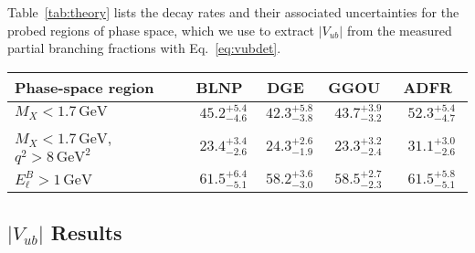 \documentclass[twocolumn,aps,prd,superscriptaddress,nofootinbib,floatfix,preprintnumbers,a4]{revtex4-1}
\newcommand{\Vub}{V_{ub}}
\newcommand{\bulnu}{\ensuremath{B \to X_u \, \ell^+\, \nu_{\ell}}\xspace}
\begin{document}
Table~\ref{tab:theory} lists the decay rates and their associated uncertainties for the probed regions of phase space, which we use to extract $|V_{ub}|$ from the measured partial branching fractions with Eq.~\ref{eq:vubdet}. 

\begin{table*}
\caption{
	The theory rates $\Delta \Gamma(\bulnu)$ from various theory calculations are listed. The rates are given in units of $\text{ps}^{-1}$.
}
\label{tab:theory}
\begin{tabular}{lcccc}
\hline\hline
  Phase-space region& BLNP~\cite{BLNP}  & DGE~\cite{DGE1,DGE2} & GGOU~\cite{GGOU} & ADFR~\cite{ADFR1,ADFR2}  \\
 \hline
    $M_X < 1.7 \, \text{GeV}$   					      & $45.2^{+5.4}_{-4.6}$  & $42.3^{+5.8}_{-3.8}$ & $43.7^{+3.9}_{-3.2}$ & $52.3^{+5.4}_{-4.7}$\\
    $M_X < 1.7 \, \text{GeV}$, $q^2 > 8 \, \text{GeV}^2$   & $23.4^{+3.4}_{-2.6}$ & $24.3^{+2.6}_{-1.9}$ & $23.3^{+3.2}_{-2.4}$ & $31.1^{+3.0}_{-2.6}$\\
    $E_\ell^B > 1 \, \mathrm{GeV}$ 				     & $61.5^{+6.4}_{-5.1}$  & $58.2^{+3.6}_{-3.0}$ & $58.5^{+2.7}_{-2.3}$ & $61.5^{+5.8}_{-5.1}$\\
 \hline\hline
\end{tabular}
\end{table*}

\subsection{$|\Vub|$ Results}
\end{document}
